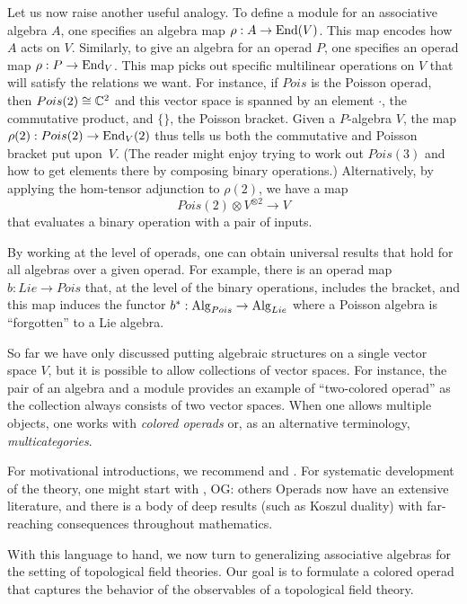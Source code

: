 \documentclass[11pt]{amsart}
\def\owen#1{{\textcolor{violet!50!black}{OG: {#1}}}}
\begin{document}
Let us now raise another useful analogy.
To define a module for an associative algebra $A$, one specifies an algebra map $\rho: A \to {\rm End}(V)$.
This map encodes how $A$ acts on $V$.
Similarly, to give an algebra for an operad $P$, one specifies an operad map $\rho: P \to {\rm End}_V$.
This map picks out specific multilinear operations on $V$ that will satisfy the relations we want.
For instance, if $Pois$ is the Poisson operad, then $Pois(2) \cong \mathbb C^2$ and this vector space is spanned by an element $\cdot$, the commutative product, and $\{\}$, the Poisson bracket.
Given a $P$-algebra $V$, the map $\rho(2): Pois(2) \to {\rm End}_V(2)$ thus tells us both the commutative and Poisson bracket put upon~$V$.
(The reader might enjoy trying to work out $Pois(3)$ and how to get elements there by composing binary operations.)
Alternatively, by applying the hom-tensor adjunction to $\rho(2)$, we have a map
\[
Pois(2) \otimes V^{\otimes 2} \to V
\]
that evaluates a binary operation with a pair of inputs.

By working at the level of operads, one can obtain universal results that hold for all algebras over a given operad.
For example, there is an operad map $b: Lie \to Pois$ that, at the level of the binary operations, includes the bracket, 
and this map induces the functor $b^*: {\rm Alg}_{Pois} \to {\rm Alg}_{Lie}$ where a Poisson algebra is ``forgotten'' to a Lie algebra.

So far we have only discussed putting algebraic structures on a single vector space $V$,
but it is possible to allow collections of vector spaces.
For instance, the pair of an algebra and a module provides an example of ``two-colored operad'' as the collection always consists of two vector spaces.
When one allows multiple objects, one works with {\em colored operads} or, as an alternative terminology, {\em multicategories}.

\begin{rmk}
For motivational introductions, we recommend \cite{StashAMS} and \cite{Val12}.
For systematic development of the theory, one might start with \cite{LodVal}, \owen{others}
Operads now have an extensive literature, and there is a body of deep results (such as Koszul duality) with far-reaching consequences throughout mathematics.
\end{rmk}

With this language to hand, we now turn to generalizing associative algebras for the setting of topological field theories. 
Our goal is to formulate a colored operad that captures the behavior of the observables of a topological field theory.
\end{document}
